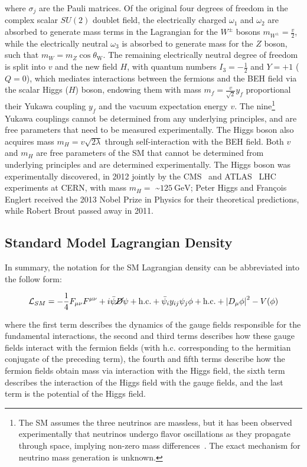 where $\sigma_j$ are the Pauli matrices.
Of the original four degrees of freedom in the complex scalar $SU(2)$ doublet field, the electrically charged $\omega_1$ and $\omega_2$ are absorbed to generate mass terms in the Lagrangian for the $W^\pm$ bosons $m_{W^\pm} = \frac{v}{2}$, while the electrically neutral $\omega_3$ is absorbed to generate mass for the $Z$ boson, such that $m_W = m_Z \cos \theta_{\mathrm{W}}$.
The remaining electrically neutral degree of freedom is split into $v$ and the new field $H$, with quantum numbers $I_3 = -\frac{1}{2}$ and $Y = +1$ ($Q = 0$), which mediates interactions between the fermions and the BEH field via the scalar Higgs ($H$) boson, endowing them with mass $m_f = \frac{v}{\sqrt{2}} y_f$ proportional their Yukawa coupling $y_f$ and the vacuum expectation energy $v$.
The nine\footnote{The SM assumes the three neutrinos are massless, but it has been observed experimentally that neutrinos undergo flavor oscillations as they propagate through space, implying non-zero mass differences~\cite{PhysRevLett.81.1562}. The exact mechanism for neutrino mass generation is unknown.} Yukawa couplings cannot be determined from any underlying principles, and are free parameters that need to be measured experimentally.
The Higgs boson also acquires mass $m_H = v \sqrt{2 \lambda}$ through self-interaction with the BEH field.
Both $v$ and $m_H$ are free parameters of the SM that cannot be determined from underlying principles and are determined experimentally.
The Higgs boson was experimentally discovered, in 2012 jointly by the CMS~\cite{201230} and ATLAS~\cite{20121} LHC experiments at CERN, with mass $m_H =$ \sim$\SI{125}{\GeV}$; Peter Higgs and François Englert received the 2013 Nobel Prize in Physics for their theoretical predictions, while Robert Brout passed away in 2011.

\subsection{Standard Model Lagrangian Density}
In summary, the notation for the SM Lagrangian density can be abbreviated into the follow form:
\begin{linenomath*}
\begin{align}
\mathcal{L}_{SM} = -\frac{1}{4} F_{\mu \nu} F^{\mu \nu} + i\bar{\psi} \cancel{D} \psi+\text {h.c.} + \bar{\psi}_i y_{i j} \psi_j \phi+\text {h.c.} + \left \vert D_\mu \phi\right \vert^2 - V(\phi)
\end{align}
\end{linenomath*}
where the first term describes the dynamics of the gauge fields responsible for the fundamental interactions, the second and third terms describes how these gauge fields interact with the fermion fields (with h.c. corresponding to the hermitian conjugate of the preceding term), the fourth and fifth terms describe how the fermion fields obtain mass via interaction with the Higgs field, the sixth term describes the interaction of the Higgs field with the gauge fields, and the last term is the potential of the Higgs field.

